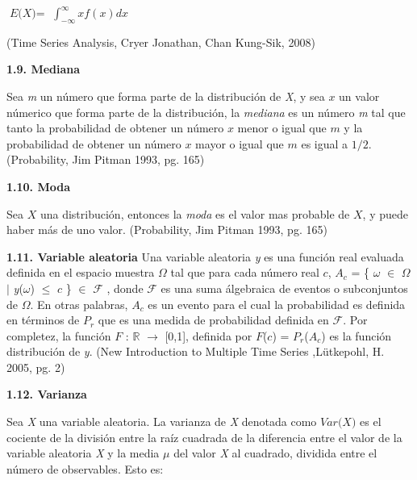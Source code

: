 \begin{center}
$\textit{E(X)} =$ $\int_{-\infty}^{\infty} x f(x) dx $
\end{center}
(Time Series Analysis, Cryer Jonathan, Chan Kung-Sik, 2008)
\newline

{
\Large  \textbf{1.9. Mediana} 
}

Sea \textit{m} un número que forma parte de la distribución de \textit{X}, y sea $\textit{x}$ un valor númerico que forma parte de la distribución, la \textit{mediana} es un número \textit{m} tal que tanto la probabilidad de obtener un número $\textit{x}$ menor o igual que $\textit{m}$ y la probabilidad de obtener un número $\textit{x}$ mayor o igual que $\textit{m}$ es igual a $1/2$. (Probability, Jim Pitman 1993, pg. 165)
\newline

{
\Large  \textbf{1.10. Moda} 
}

Sea $\textit{X}$ una distribución, entonces la \textit{moda} es el valor mas probable de $\textit{X}$, y puede haber más de uno valor. (Probability, Jim Pitman 1993, pg. 165)
\newline

{
\Large  \textbf{1.11. Variable aleatoria} 
}
\newline
Una variable aleatoria \textit{y} es una función real evaluada definida en el espacio muestra $\mathit{\Omega}$ tal que para cada número real $\mathit{c}$, $A_{c}$ =  \{ $\omega$ $\in$ $\Omega$ $\mid$ \textit{y}($\omega$) $\leq$ $\mathit{c}$ \} $\in$  $\mathcal{F}$ , donde $\mathcal{F}$ es una suma álgebraica de eventos o subconjuntos de $\mathit{\Omega}$. En otras palabras, $A_{c}$ es un evento para el cual la probabilidad es definida en términos de $P_{r}$ que es una medida de probabilidad definida en $\mathcal{F}$. Por completez, la función $\mathit{F}$ : $\mathbb{R}$ $ \rightarrow$ [0,1], definida por $\mathit{F}$($\mathit{c}$) = $P_{r}$($A_{c}$) es la función distribución de  \textit{y}. (New Introduction to Multiple Time Series ,L\"{u}tkepohl, H. 2005, pg. 2)
\newline

{
\Large  \textbf{1.12. Varianza} 
}

Sea \textit{X} una variable aleatoria. La varianza de \textit{X} denotada como $\textit{Var(X)}$  es el cociente de la división entre la raíz cuadrada de la diferencia entre el valor de la variable aleatoria \textit{X} y la media $\mu$ del valor \textit{X} al cuadrado, dividida entre el número de observables. Esto es:

